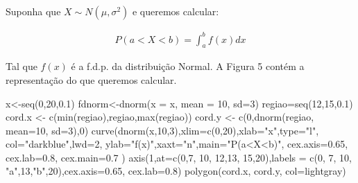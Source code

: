 \documentclass[
  letterpaper,
  DIV=11,
  numbers=noendperiod]{scrartcl}
\newenvironment{Shaded}{\begin{snugshade}}{\end{snugshade}}
\newcommand{\AttributeTok}[1]{\textcolor[rgb]{0.40,0.45,0.13}{#1}}
\newcommand{\DecValTok}[1]{\textcolor[rgb]{0.68,0.00,0.00}{#1}}
\newcommand{\FloatTok}[1]{\textcolor[rgb]{0.68,0.00,0.00}{#1}}
\newcommand{\FunctionTok}[1]{\textcolor[rgb]{0.28,0.35,0.67}{#1}}
\newcommand{\NormalTok}[1]{\textcolor[rgb]{0.00,0.23,0.31}{#1}}
\newcommand{\OtherTok}[1]{\textcolor[rgb]{0.00,0.23,0.31}{#1}}
\newcommand{\StringTok}[1]{\textcolor[rgb]{0.13,0.47,0.30}{#1}}
\begin{document}
\vspace{2cm}

Suponha que \(X \sim N(\mu ,\sigma ^{2})\) e queremos calcular:

\[\begin{array}{ccc}
P(a<X<b)=\int_{a}^{b}f(x) dx
\end{array}\]

Tal que \(f(x)\) é a f.d.p. da distribuição Normal. A Figura 5 contém a
representação do que queremos calcular.

\begin{Shaded}
\begin{Highlighting}[]
\NormalTok{x}\OtherTok{\textless{}{-}}\FunctionTok{seq}\NormalTok{(}\DecValTok{0}\NormalTok{,}\DecValTok{20}\NormalTok{,}\FloatTok{0.1}\NormalTok{) }
\NormalTok{fdnorm}\OtherTok{\textless{}{-}}\FunctionTok{dnorm}\NormalTok{(}\AttributeTok{x =}\NormalTok{ x, }\AttributeTok{mean =} \DecValTok{10}\NormalTok{, }\AttributeTok{sd=}\DecValTok{3}\NormalTok{)   }
\NormalTok{regiao}\OtherTok{=}\FunctionTok{seq}\NormalTok{(}\DecValTok{12}\NormalTok{,}\DecValTok{15}\NormalTok{,}\FloatTok{0.1}\NormalTok{)}
\NormalTok{cord.x }\OtherTok{\textless{}{-}} \FunctionTok{c}\NormalTok{(}\FunctionTok{min}\NormalTok{(regiao),regiao,}\FunctionTok{max}\NormalTok{(regiao))}
\NormalTok{cord.y }\OtherTok{\textless{}{-}} \FunctionTok{c}\NormalTok{(}\DecValTok{0}\NormalTok{,}\FunctionTok{dnorm}\NormalTok{(regiao, }\AttributeTok{mean=}\DecValTok{10}\NormalTok{, }\AttributeTok{sd=}\DecValTok{3}\NormalTok{),}\DecValTok{0}\NormalTok{) }
\FunctionTok{curve}\NormalTok{(}\FunctionTok{dnorm}\NormalTok{(x,}\DecValTok{10}\NormalTok{,}\DecValTok{3}\NormalTok{),}\AttributeTok{xlim=}\FunctionTok{c}\NormalTok{(}\DecValTok{0}\NormalTok{,}\DecValTok{20}\NormalTok{),}\AttributeTok{xlab=}\StringTok{"x"}\NormalTok{,}\AttributeTok{type=}\StringTok{"l"}\NormalTok{, }
      \AttributeTok{col=}\StringTok{"darkblue"}\NormalTok{,}\AttributeTok{lwd=}\DecValTok{2}\NormalTok{, }\AttributeTok{ylab=}\StringTok{"f(x)"}\NormalTok{,}\AttributeTok{xaxt=}\StringTok{"n"}\NormalTok{,}\AttributeTok{main=}\StringTok{"P(a\textless{}X\textless{}b)"}\NormalTok{,}
      \AttributeTok{cex.axis=}\FloatTok{0.65}\NormalTok{, }\AttributeTok{cex.lab=}\FloatTok{0.8}\NormalTok{, }\AttributeTok{cex.main=}\FloatTok{0.7}\NormalTok{ ) }
\FunctionTok{axis}\NormalTok{(}\DecValTok{1}\NormalTok{,}\AttributeTok{at=}\FunctionTok{c}\NormalTok{(}\DecValTok{0}\NormalTok{,}\DecValTok{7}\NormalTok{, }\DecValTok{10}\NormalTok{, }\DecValTok{12}\NormalTok{,}\DecValTok{13}\NormalTok{, }\DecValTok{15}\NormalTok{,}\DecValTok{20}\NormalTok{),}\AttributeTok{labels =}
       \FunctionTok{c}\NormalTok{(}\DecValTok{0}\NormalTok{, }\DecValTok{7}\NormalTok{, }\DecValTok{10}\NormalTok{, }\StringTok{"a"}\NormalTok{,}\DecValTok{13}\NormalTok{,}\StringTok{"b"}\NormalTok{,}\DecValTok{20}\NormalTok{),}\AttributeTok{cex.axis=}\FloatTok{0.65}\NormalTok{, }\AttributeTok{cex.lab=}\FloatTok{0.8}\NormalTok{) }
\FunctionTok{polygon}\NormalTok{(cord.x, cord.y, }\AttributeTok{col=}\StringTok{\textquotesingle{}lightgray\textquotesingle{}}\NormalTok{)}
\end{Highlighting}
\end{Shaded}
\end{document}

